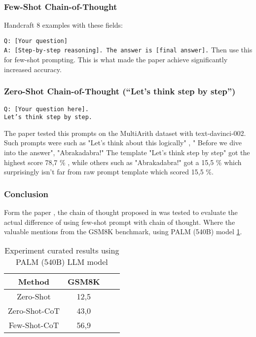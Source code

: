 \subsubsection{Few-Shot Chain-of-Thought \cite{chainofthought}}
Handcraft 8 examples with these fields:

\texttt{Q: [Your question]}\\
\texttt{A: [Step-by-step reasoning]. The answer is [final answer].}
Then use this for few-shot prompting. This is what made the paper achieve significantly increased accuracy.

\subsubsection{Zero-Shot Chain-of-Thought (“Let’s think step by step”) \cite{chainofzero}}
\texttt{Q: [Your question here].}\\
\texttt{Let’s think step by step.}

The paper \cite{chainofzero} tested this prompts on the MultiArith dataset with text-davinci-002. Such prompts were such as "Let’s think about this logically" , " Before we dive into the answer", "Abrakadabra!"
The template "Let's think step by step" got the highest score 78,7 \% , while others such as "Abrakadabra!" got a 15,5 \% which surprisingly isn't far from raw prompt template which scored 15,5 \%.

\subsubsection{Conclusion}
Form the paper \cite{chainofzero}, the chain of thought proposed in \cite{chainofthought} was tested to evaluate the actual difference of using few-shot prompt with chain of thought.
Where the valuable mentions from the GSM8K benchmark, using PALM (540B) model \ref{tab:chainofzero}.

\begin{table}[h!]
    \centering
    \begin{tabular}{|c|c|cc}
        \hline
        Method & GSM8K\\
        \hline
        Zero-Shot & 12,5 \\
        \hline
        Zero-Shot-CoT \cite{chainofzero} & 43,0 \\
        \hline
        Few-Shot-CoT \cite{chainofthought} & 56,9 \\
        \hline
    \end{tabular}
    \caption{Experiment curated results using PALM (540B) \gls{LLM} model \cite{chainofzero}}
    \label{tab:chainofzero}
\end{table}

